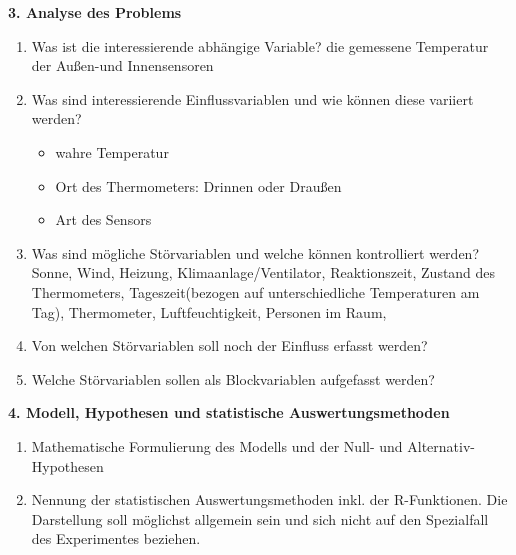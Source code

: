 \documentclass[ ngerman, fontsize= 12pt, paper=a4, headings=big, titlepage=true]{article}
\begin{document}
\textbf{3. Analyse des Problems}
\begin{enumerate}[-]
\item Was ist die interessierende abhängige Variable?
	die gemessene Temperatur der Außen-und Innensensoren
\item Was sind interessierende Einflussvariablen und wie können diese variiert werden? \\
\begin{itemize}
	\item wahre Temperatur\\
	\item Ort des Thermometers: Drinnen oder Draußen
	\item Art des Sensors 
\end{itemize}



\item Was sind mögliche Störvariablen und welche können kontrolliert werden?\\
Sonne, Wind, Heizung, Klimaanlage/Ventilator, Reaktionszeit, Zustand des Thermometers,  Tageszeit(bezogen auf unterschiedliche Temperaturen am Tag), Thermometer, Luftfeuchtigkeit, Personen im Raum,
\item Von welchen Störvariablen soll noch der Einfluss erfasst werden? \\
\item Welche Störvariablen sollen als Blockvariablen aufgefasst werden? \\
\end{enumerate}

\textbf{4. Modell, Hypothesen und statistische Auswertungsmethoden}
\begin{enumerate}[-]
\item  Mathematische Formulierung des Modells und der Null- und Alternativ-Hypothesen \\

\item Nennung der statistischen Auswertungsmethoden inkl. der R-Funktionen. Die Darstellung soll möglichst allgemein sein und sich nicht auf den Spezialfall des Experimentes beziehen. \\

\end{enumerate}
\end{document}
